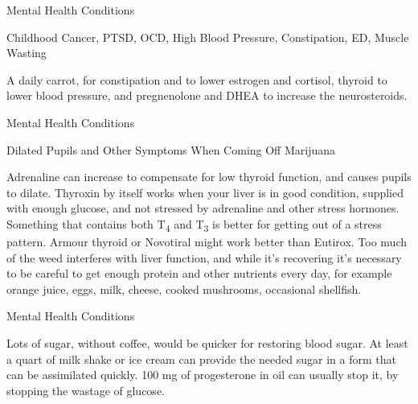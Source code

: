 \documentclass[11pt,oneside,openany,extrafontsizes]{memoir}
\begin{document}
\begin{standalonequote}{Mental Health Conditions}
    \begin{note}
        Childhood Cancer, PTSD, OCD, High Blood Pressure, Constipation, ED, Muscle Wasting
    \end{note}

    \begin{answer}
        A daily carrot, for constipation and to lower estrogen and cortisol, thyroid to lower blood pressure, and pregnenolone and DHEA to increase the neurosteroids.
    \end{answer}
\end{standalonequote}

\begin{standalonequote}{Mental Health Conditions}
    \begin{note}
        Dilated Pupils and Other Symptoms When Coming Off Marijuana
    \end{note}

    \begin{answer}
        Adrenaline can increase to compensate for low thyroid function, and causes pupils to dilate. Thyroxin by itself works when your liver is in good condition, supplied with enough glucose, and not stressed by adrenaline and other stress hormones. Something that contains both T\textsubscript{4} and T\textsubscript{3} is better for getting out of a stress pattern. Armour thyroid or Novotiral might work better than Eutirox. Too much of the weed interferes with liver function, and while it's recovering it's necessary to be careful to get enough protein and other nutrients every day, for example orange juice, eggs, milk, cheese, cooked mushrooms, occasional shellfish.
    \end{answer}
\end{standalonequote}

\begin{standalonequote}{Mental Health Conditions}

    \begin{answer}
        Lots of sugar, without coffee, would be quicker for restoring blood sugar. At least a quart of milk shake or ice cream can provide the needed sugar in a form that can be assimilated quickly. 100 mg of progesterone in oil can usually stop it, by stopping the wastage of glucose.
    \end{answer}
\end{standalonequote}
\end{document}
